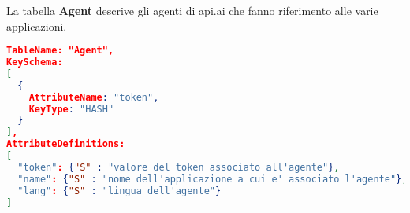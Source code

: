 La tabella \textbf{Agent} descrive gli agenti di api.ai che fanno riferimento alle varie applicazioni.
\begin{lstlisting}[language=json,firstnumber=1]
TableName: "Agent",
KeySchema:
[
  {
    AttributeName: "token",
    KeyType: "HASH"
  }	
],
AttributeDefinitions: 
[
  "token": {"S" : "valore del token associato all'agente"},
  "name": {"S" : "nome dell'applicazione a cui e' associato l'agente"},
  "lang": {"S" : "lingua dell'agente"}
]
\end{lstlisting}